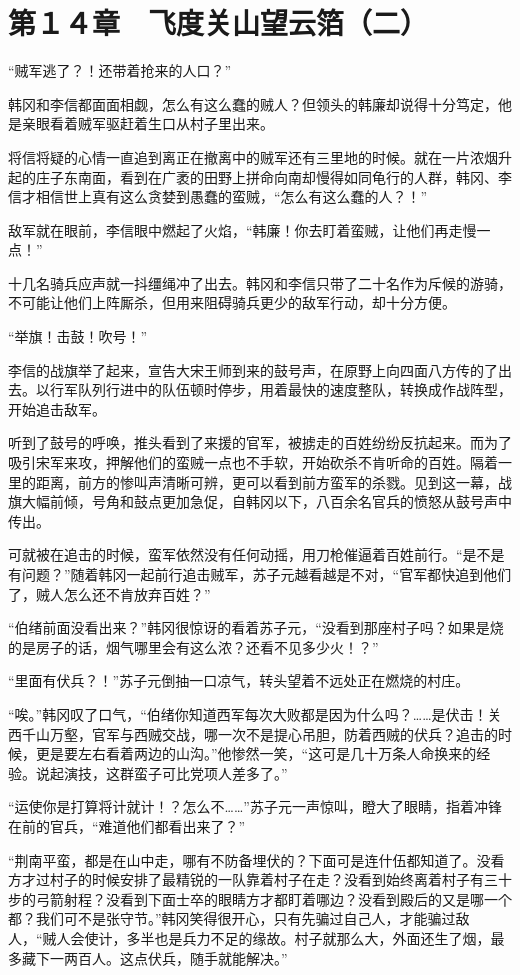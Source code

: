 \section{第１４章　飞度关山望云箔（二）}

“贼军逃了？！还带着抢来的人口？”

韩冈和李信都面面相觑，怎么有这么蠢的贼人？但领头的韩廉却说得十分笃定，他是亲眼看着贼军驱赶着生口从村子里出来。

将信将疑的心情一直追到离正在撤离中的贼军还有三里地的时候。就在一片浓烟升起的庄子东南面，看到在广袤的田野上拼命向南却慢得如同龟行的人群，韩冈、李信才相信世上真有这么贪婪到愚蠢的蛮贼，“怎么有这么蠢的人？！”

敌军就在眼前，李信眼中燃起了火焰，“韩廉！你去盯着蛮贼，让他们再走慢一点！”

十几名骑兵应声就一抖缰绳冲了出去。韩冈和李信只带了二十名作为斥候的游骑，不可能让他们上阵厮杀，但用来阻碍骑兵更少的敌军行动，却十分方便。

“举旗！击鼓！吹号！”

李信的战旗举了起来，宣告大宋王师到来的鼓号声，在原野上向四面八方传的了出去。以行军队列行进中的队伍顿时停步，用着最快的速度整队，转换成作战阵型，开始追击敌军。

听到了鼓号的呼唤，推头看到了来援的官军，被掳走的百姓纷纷反抗起来。而为了吸引宋军来攻，押解他们的蛮贼一点也不手软，开始砍杀不肯听命的百姓。隔着一里的距离，前方的惨叫声清晰可辨，更可以看到前方蛮军的杀戮。见到这一幕，战旗大幅前倾，号角和鼓点更加急促，自韩冈以下，八百余名官兵的愤怒从鼓号声中传出。

可就被在追击的时候，蛮军依然没有任何动摇，用刀枪催逼着百姓前行。“是不是有问题？”随着韩冈一起前行追击贼军，苏子元越看越是不对，“官军都快追到他们了，贼人怎么还不肯放弃百姓？”

“伯绪前面没看出来？”韩冈很惊讶的看着苏子元，“没看到那座村子吗？如果是烧的是房子的话，烟气哪里会有这么浓？还看不见多少火！？”

“里面有伏兵？！”苏子元倒抽一口凉气，转头望着不远处正在燃烧的村庄。

“唉。”韩冈叹了口气，“伯绪你知道西军每次大败都是因为什么吗？……是伏击！关西千山万壑，官军与西贼交战，哪一次不是提心吊胆，防着西贼的伏兵？追击的时候，更是要左右看着两边的山沟。”他惨然一笑，“这可是几十万条人命换来的经验。说起演技，这群蛮子可比党项人差多了。”

“运使你是打算将计就计！？怎么不……”苏子元一声惊叫，瞪大了眼睛，指着冲锋在前的官兵，“难道他们都看出来了？”

“荆南平蛮，都是在山中走，哪有不防备埋伏的？下面可是连什伍都知道了。没看方才过村子的时候安排了最精锐的一队靠着村子在走？没看到始终离着村子有三十步的弓箭射程？没看到下面士卒的眼睛方才都盯着哪边？没看到殿后的又是哪一个都？我们可不是张守节。”韩冈笑得很开心，只有先骗过自己人，才能骗过敌人，“贼人会使计，多半也是兵力不足的缘故。村子就那么大，外面还生了烟，最多藏下一两百人。这点伏兵，随手就能解决。”


